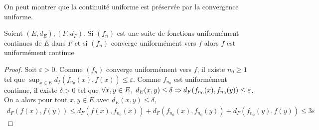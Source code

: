 On peut montrer que la continuité uniforme est préservée par la convergence uniforme.
\begin{proposition}
    Soient $(E,d_E), (F,d_F)$. Si $(f_n)$ est une suite de fonctions uniformément continues de $E$ dans $F$ et si $(f_n)$ converge uniformément vers $f$ alors $f$ est uniformément continue
\end{proposition}
\begin{proof}
    Soit $\varepsilon>0$. Comme $(f_n)$ converge uniformément vers $f$, il existe $n_0\ge 1$ tel que $\sup_{x\in E}d_f(f_{n_0}(x),f(x))\le \varepsilon$. Comme $f_{n_0}$ est uniformément continue, il existe $\delta>0$ tel que $\forall x,y\in E,\ d_E(x,y)\le\delta\alors d_F(f_{n_0}(x),f_{n_0}(y))\le \varepsilon$. On a alors pour tout $x,y\in E$ avec $d_E(x,y)\le \delta$, \begin{align*}
        d_F(f(x),f(y))\le d_F(f(x),f_{n_0}(x))  + d_F(f_{n_0}(x),f_{n_0}(y))+d_F(f_{n_0}(y),f(y))\le 3\varepsilon
    \end{align*}
\end{proof}
